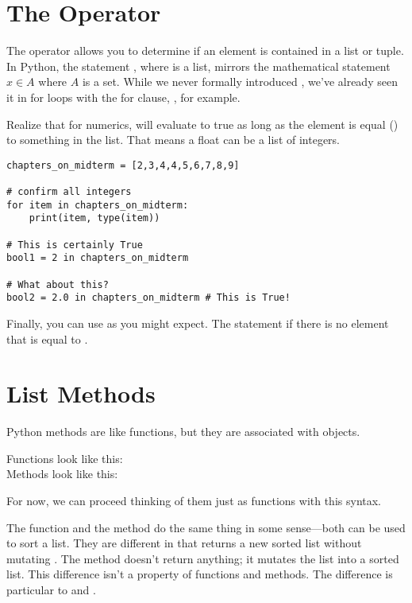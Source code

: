 \section{The  Operator}

The  operator allows you to determine if an element is contained in a list or tuple. In Python, the statement , where  is a list, mirrors the mathematical statement $x\in A$ where $A$ is a set. While we never formally introduced , we've already seen it in for loops with the for clause, , for example.

\smallskip

Realize that for numerics,  will evaluate to true as long as the element is equal (\code{==}) to something in the list. That means a float can be  a list of integers.

\begin{lstlisting}
chapters_on_midterm = [2,3,4,4,5,6,7,8,9]

# confirm all integers
for item in chapters_on_midterm:
    print(item, type(item))

# This is certainly True
bool1 = 2 in chapters_on_midterm

# What about this? 
bool2 = 2.0 in chapters_on_midterm # This is True!
\end{lstlisting}

\smallskip

\noindent Finally, you can use  as you might expect. The statement  if there is no element  that is equal to .

\section{List Methods}

Python methods are like functions, but they are associated with objects.

\smallskip
\noindent Functions look like this: \\
\noindent Methods look like this: 

\smallskip
\noindent For now, we can proceed thinking of them just as functions with this syntax. 

\smallskip
The function  and the method  do the same thing in some sense---both can be used to sort a list. They are different in that  returns a new sorted list without mutating . The method  doesn't return anything; it mutates the list into a sorted list. This difference isn't a property of functions and methods. The difference is particular to  and . 

